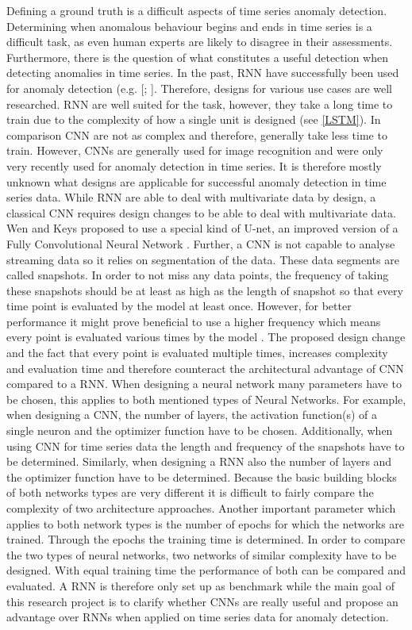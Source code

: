 Defining a ground truth is a difficult aspects of time series anomaly detection. Determining when anomalous behaviour begins and ends in time series is a difficult task, as even human experts are likely to disagree in their assessments. Furthermore, there is the question of what constitutes a useful detection when detecting anomalies in time series.
In the past, RNN have successfully been used for anomaly detection (e.g. [\parencite{Malhotra2015}; \parencite{Fan2016}]. Therefore, designs for various use cases are well researched. RNN are well suited for the task, however, they take a long time to train due to the complexity of how a single unit is designed (see \ref{LSTM}). In comparison CNN are not as complex and therefore, generally take less time to train. However, CNNs are generally used for image recognition and were only very recently used for anomaly detection in time series. It is therefore mostly unknown what designs are applicable for successful anomaly detection in time series data. %
While RNN are able to deal with multivariate data by design, a classical CNN requires design changes to be able to deal with multivariate data. Wen and Keys \parencite*{Wen2019} proposed to use a special kind of U-net, an improved version of a Fully Convolutional Neural Network \parencite{Ronneberger2015}.
Further, a CNN is not capable to analyse streaming data so it relies on segmentation of the data. These data segments are called snapshots. In order to not miss any data points, the frequency of taking these snapshots should be at least as high as the length of snapshot so that every time point is evaluated by the model at least once. However, for better performance it might prove beneficial to use a higher frequency which means every point is evaluated various times by the model \parencite{Wen2019}. The proposed design change and the fact that every point is evaluated multiple times, increases complexity and evaluation time and therefore counteract the architectural advantage of CNN compared to a RNN. 
When designing a neural network many parameters have to be chosen, this applies to both mentioned types of Neural Networks. For example, when designing a CNN, the number of layers, the activation function(s) of a single neuron and the optimizer function have to be chosen. Additionally, when using CNN for time series data the length and frequency of the snapshots have to be determined. Similarly, when designing a RNN also the number of layers and the optimizer function have to be determined. Because the basic building blocks of both networks types are very different it is difficult to fairly compare the complexity of two architecture approaches. Another important parameter which applies to both network types is the number of epochs for which the networks are trained. Through the epochs the training time is determined. In order to compare the two types of neural networks, two networks of similar complexity have to be designed. With equal training time the performance of both can be compared and evaluated. A RNN is therefore only set up as benchmark while the main goal of this research project is to clarify whether CNNs are really useful and propose an advantage over RNNs when applied on time series data for anomaly detection.

